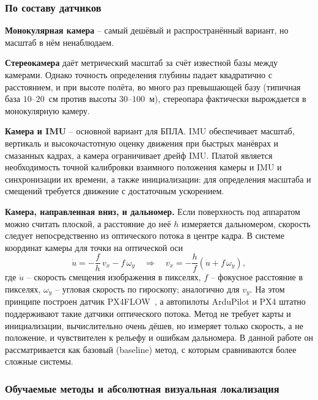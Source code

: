    \subsubsection{По составу датчиков}

    \textbf{Монокулярная камера} -- самый дешёвый и распространённый вариант, но масштаб в нём ненаблюдаем.

    \textbf{Стереокамера} даёт метрический масштаб за счёт известной базы между камерами.
    Однако точность определения глубины падает квадратично с расстоянием, и при высоте полёта, во много раз превышающей базу (типичная база $10$--$20$~см против высоты $30$--$100$~м), стереопара фактически вырождается в монокулярную камеру.

    \textbf{Камера и IMU} -- основной вариант для БПЛА.
    IMU обеспечивает масштаб, вертикаль и высокочастотную оценку движения при быстрых манёврах и смазанных кадрах, а камера ограничивает дрейф IMU.
    Платой является необходимость точной калибровки взаимного положения камеры и IMU и синхронизации их времени, а также инициализации: для определения масштаба и смещений требуется движение с достаточным ускорением.

    \textbf{Камера, направленная вниз, и дальномер.}
    Если поверхность под аппаратом можно считать плоской, а расстояние до неё $h$ измеряется дальномером, скорость следует непосредственно из оптического потока в центре кадра.
    В системе координат камеры для точки на оптической оси
    \begin{equation}\label{eq:flow}
        \dot{u} = -\frac{f}{h}\, v_x - f\, \omega_y
        \quad\Longrightarrow\quad
        v_x = -\frac{h}{f} \left( \dot{u} + f\, \omega_y \right),
    \end{equation}
    где $\dot{u}$ -- скорость смещения изображения в пикселях, $f$ -- фокусное расстояние в пикселях, $\omega_y$ -- угловая скорость по гироскопу; аналогично для $v_y$.
    На этом принципе построен датчик PX4FLOW~\cite{px4flow}, а автопилоты ArduPilot и PX4 штатно поддерживают такие датчики оптического потока.
    Метод не требует карты и инициализации, вычислительно очень дёшев, но измеряет только скорость, а не положение, и чувствителен к рельефу и ошибкам дальномера.
    В данной работе он рассматривается как базовый (baseline) метод, с которым сравниваются более сложные системы.

    \subsubsection{Обучаемые методы и абсолютная визуальная локализация}

